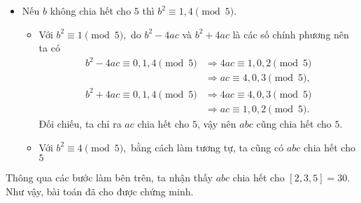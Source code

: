 \begin{gbtt}
{\begin{enumerate}
\begin{itemize}
    \item Nếu $b$ không chia hết cho $5$ thì $b^{2} \equiv 1,4\pmod{5}$.
    \begin{itemize}
        \item Với $b^2\equiv 1\pmod{5},$ do ${b}^{2}-4 {ac}$ và $b^{2}+4ac$ là các số chính phương nên ta có
    \begin{align*}
        b^2-4ac\equiv 0,1,4\pmod{5}&\Rightarrow 4ac\equiv 1,0,2\pmod{5}\\&\Rightarrow ac\equiv 4,0,3\pmod{5},\\
        b^2+4ac\equiv 0,1,4\pmod{5}&\Rightarrow 4ac\equiv 4,0,3\pmod{5}\\&\Rightarrow ac\equiv 1,0,2\pmod{5}.
    \end{align*}
    Đối chiếu, ta chỉ ra $ac$ chia hết cho $5$, vậy nên $abc$ cũng chia hết cho $5.$
        \item Với $b^2\equiv 4\pmod{5},$ bằng cách làm tương tự, ta cũng có $abc$ chia hết cho $5$  
    \end{itemize}
\end{itemize}
\end{enumerate}
Thông qua các bước làm bên trên, ta nhận thấy $abc$ chia hết cho $[2,3,5]=30.$ \\
Như vậy, bài toán đã cho được chứng minh.}
\end{gbtt}

